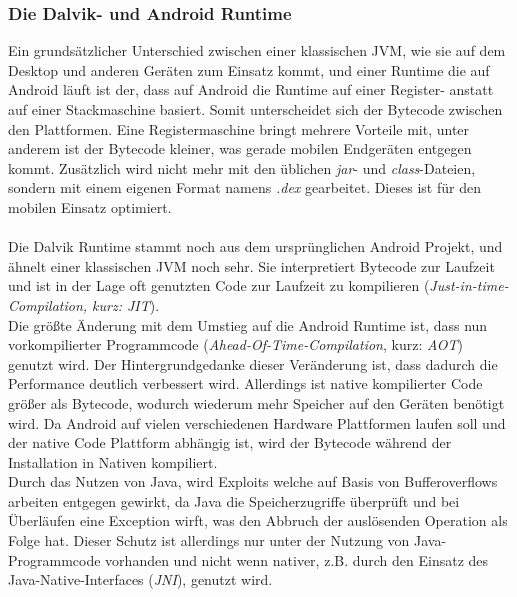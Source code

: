 \subsubsection{Die Dalvik- und Android Runtime}
	Ein grundsätzlicher Unterschied zwischen einer klassischen JVM, wie sie auf dem Desktop und anderen Geräten zum Einsatz kommt, und einer Runtime die auf Android läuft ist der, dass auf Android die Runtime auf einer Register- anstatt auf einer Stackmaschine basiert\cite{DalvikBytecode}. Somit unterscheidet sich der Bytecode zwischen den Plattformen. Eine Registermaschine bringt mehrere Vorteile mit, unter anderem ist der Bytecode kleiner, was gerade mobilen Endgeräten entgegen kommt.
	Zusätzlich wird nicht mehr mit den üblichen \textit{jar}- und \textit{class}-Dateien, sondern mit einem eigenen Format namens \textit{.dex} gearbeitet\cite{DexFormat}. Dieses ist für den mobilen Einsatz optimiert.\\\\
	Die Dalvik Runtime stammt noch aus dem ursprünglichen Android Projekt, und ähnelt einer klassischen JVM noch sehr. Sie interpretiert Bytecode zur Laufzeit und ist in der Lage oft genutzten Code zur Laufzeit zu kompilieren (\textit{Just-in-time-Compilation, kurz: JIT}). \\
	Die größte Änderung mit dem Umstieg auf die Android Runtime ist, dass nun vorkompilierter Programmcode (\textit{Ahead-Of-Time-Compilation}, kurz: \textit{AOT}) genutzt wird. Der Hintergrundgedanke dieser Veränderung ist, dass dadurch die Performance deutlich verbessert wird. Allerdings ist native kompilierter Code größer als Bytecode, wodurch wiederum mehr Speicher auf den Geräten benötigt wird.
	Da Android auf vielen verschiedenen Hardware Plattformen laufen soll und der native Code Plattform abhängig ist, wird der Bytecode während der Installation in Nativen kompiliert.\\
	Durch das Nutzen von Java, wird Exploits welche auf Basis von Bufferoverflows arbeiten entgegen gewirkt, da Java die Speicherzugriffe überprüft und bei Überläufen eine Exception wirft, was den Abbruch der auslösenden Operation als Folge hat. Dieser Schutz ist allerdings nur unter der Nutzung von Java-Programmcode vorhanden und nicht wenn nativer, z.B. durch den Einsatz des Java-Native-Interfaces (\textit{JNI}), genutzt wird.